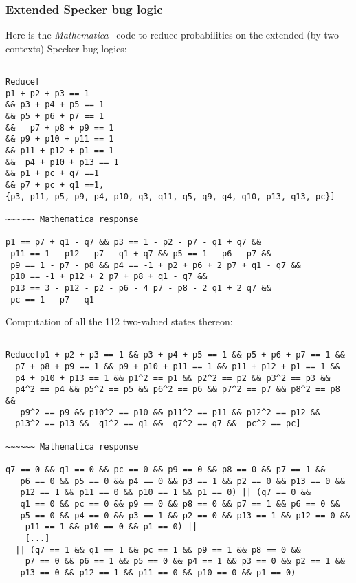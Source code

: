 \documentclass[%
 showpacs,
 showkeys,
 preprintnumbers,
 amsmath,amssymb,
 aps,
  pra,
  longbibliography,
 floatfix,
 ]{revtex4-1}
\begin{document}
\subsubsection{Extended Specker bug logic}

Here is the {\em Mathematica}~\cite{Mathematica11.1} code to reduce probabilities on the extended (by two contexts) Specker bug logics:

{ \begin{lstlisting}[backgroundcolor=\color{yellow!10},framerule=0pt,breaklines=true, frame=tb]

Reduce[
p1 + p2 + p3 == 1
&& p3 + p4 + p5 == 1
&& p5 + p6 + p7 == 1
&&   p7 + p8 + p9 == 1
&& p9 + p10 + p11 == 1
&& p11 + p12 + p1 == 1
&&  p4 + p10 + p13 == 1
&& p1 + pc + q7 ==1
&& p7 + pc + q1 ==1,
{p3, p11, p5, p9, p4, p10, q3, q11, q5, q9, q4, q10, p13, q13, pc}]

~~~~~~ Mathematica response

p1 == p7 + q1 - q7 && p3 == 1 - p2 - p7 - q1 + q7 &&
 p11 == 1 - p12 - p7 - q1 + q7 && p5 == 1 - p6 - p7 &&
 p9 == 1 - p7 - p8 && p4 == -1 + p2 + p6 + 2 p7 + q1 - q7 &&
 p10 == -1 + p12 + 2 p7 + p8 + q1 - q7 &&
 p13 == 3 - p12 - p2 - p6 - 4 p7 - p8 - 2 q1 + 2 q7 &&
 pc == 1 - p7 - q1

\end{lstlisting}  }

Computation of all the 112 two-valued states thereon:


{ \begin{lstlisting}[backgroundcolor=\color{yellow!10},framerule=0pt,breaklines=true, frame=tb]

Reduce[p1 + p2 + p3 == 1 && p3 + p4 + p5 == 1 && p5 + p6 + p7 == 1 &&
  p7 + p8 + p9 == 1 && p9 + p10 + p11 == 1 && p11 + p12 + p1 == 1 &&
  p4 + p10 + p13 == 1 && p1^2 == p1 && p2^2 == p2 && p3^2 == p3 &&
  p4^2 == p4 && p5^2 == p5 && p6^2 == p6 && p7^2 == p7 && p8^2 == p8 &&
   p9^2 == p9 && p10^2 == p10 && p11^2 == p11 && p12^2 == p12 &&
  p13^2 == p13 &&  q1^2 == q1 &&  q7^2 == q7 &&  pc^2 == pc]

~~~~~~ Mathematica response

q7 == 0 && q1 == 0 && pc == 0 && p9 == 0 && p8 == 0 && p7 == 1 &&
   p6 == 0 && p5 == 0 && p4 == 0 && p3 == 1 && p2 == 0 && p13 == 0 &&
   p12 == 1 && p11 == 0 && p10 == 1 && p1 == 0) || (q7 == 0 &&
   q1 == 0 && pc == 0 && p9 == 0 && p8 == 0 && p7 == 1 && p6 == 0 &&
   p5 == 0 && p4 == 0 && p3 == 1 && p2 == 0 && p13 == 1 && p12 == 0 &&
    p11 == 1 && p10 == 0 && p1 == 0) ||
    [...]
  || (q7 == 1 && q1 == 1 && pc == 1 && p9 == 1 && p8 == 0 &&
    p7 == 0 && p6 == 1 && p5 == 0 && p4 == 1 && p3 == 0 && p2 == 1 &&
   p13 == 0 && p12 == 1 && p11 == 0 && p10 == 0 && p1 == 0)

\end{lstlisting}  }
\end{document}
